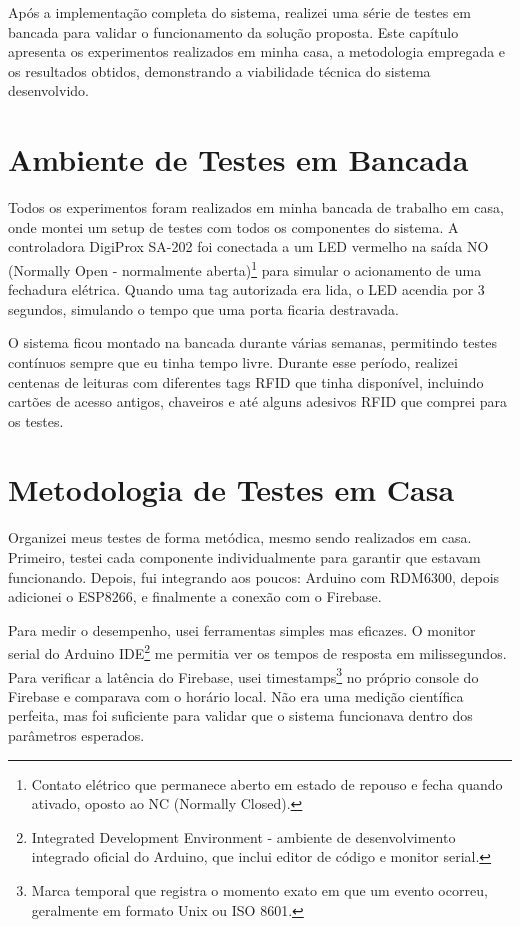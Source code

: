 
\label{Cap:ExperimentosResultados}

Após a implementação completa do sistema, realizei uma série de testes em bancada para validar o funcionamento da solução proposta. Este capítulo apresenta os experimentos realizados em minha casa, a metodologia empregada e os resultados obtidos, demonstrando a viabilidade técnica do sistema desenvolvido.

\section{Ambiente de Testes em Bancada}

Todos os experimentos foram realizados em minha bancada de trabalho em casa, onde montei um setup de testes com todos os componentes do sistema. A controladora DigiProx SA-202 foi conectada a um LED vermelho na saída NO (Normally Open - normalmente aberta)\footnote{Contato elétrico que permanece aberto em estado de repouso e fecha quando ativado, oposto ao NC (Normally Closed).} para simular o acionamento de uma fechadura elétrica. Quando uma tag autorizada era lida, o LED acendia por 3 segundos, simulando o tempo que uma porta ficaria destravada.

O sistema ficou montado na bancada durante várias semanas, permitindo testes contínuos sempre que eu tinha tempo livre. Durante esse período, realizei centenas de leituras com diferentes tags RFID que tinha disponível, incluindo cartões de acesso antigos, chaveiros e até alguns adesivos RFID que comprei para os testes.

\section{Metodologia de Testes em Casa}

Organizei meus testes de forma metódica, mesmo sendo realizados em casa. Primeiro, testei cada componente individualmente para garantir que estavam funcionando. Depois, fui integrando aos poucos: Arduino com RDM6300, depois adicionei o ESP8266, e finalmente a conexão com o Firebase.

Para medir o desempenho, usei ferramentas simples mas eficazes. O monitor serial do Arduino IDE\footnote{Integrated Development Environment - ambiente de desenvolvimento integrado oficial do Arduino, que inclui editor de código e monitor serial.} me permitia ver os tempos de resposta em milissegundos. Para verificar a latência do Firebase, usei timestamps\footnote{Marca temporal que registra o momento exato em que um evento ocorreu, geralmente em formato Unix ou ISO 8601.} no próprio console do Firebase e comparava com o horário local. Não era uma medição científica perfeita, mas foi suficiente para validar que o sistema funcionava dentro dos parâmetros esperados.

